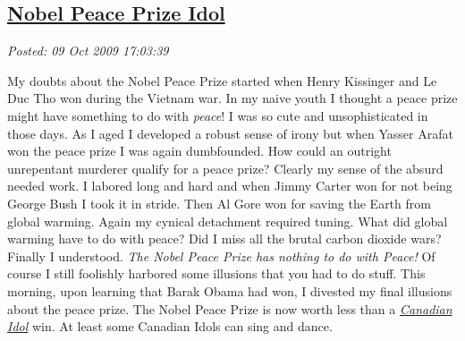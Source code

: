 %

\subsection*{\href{https://bakerjd99.wordpress.com/2009/10/09/nobel-peace-prize-idol/}{Nobel Peace Prize Idol}}


\noindent\emph{Posted: 09 Oct 2009 17:03:39}
\vspace{6pt}

My doubts about the Nobel Peace Prize started when Henry Kissinger and
Le Duc Tho won during the Vietnam war. In my naive youth I thought a
peace prize might have something to do with \emph{peace}! I was so cute
and unsophisticated in those days. As I aged I developed a robust sense
of irony but when Yasser Arafat won the peace prize I was again
dumbfounded. How could an outright unrepentant murderer qualify for a
peace prize? Clearly my sense of the absurd needed work. I labored long
and hard and when Jimmy Carter won for not being George Bush I took it
in stride. Then Al Gore won for saving the Earth from global warming.
Again my cynical detachment required tuning. What did global warming
have to do with peace? Did I miss all the brutal carbon dioxide wars?
Finally I understood. \emph{The Nobel Peace Prize has nothing to do with
Peace!} Of course I still foolishly harbored some illusions that you had
to do stuff. This morning, upon learning that Barak Obama had won, I
divested my final illusions about the peace prize. The Nobel Peace Prize
is now worth less than a
\emph{\href{http://www.ctv.ca/idol/gen/Home.html}{Canadian Idol}} win.
At least some Canadian Idols can sing and dance.


%